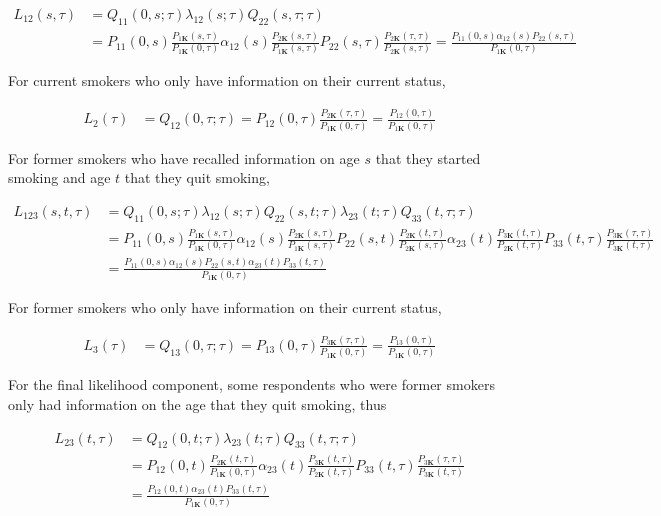 \documentclass[11pt,a4paper]{article}
\newcommand{\K}{\ensuremath{\bm{K}}}
\begin{document}
\begin{align*}
L_{12}(s,\tau) & = Q_{11}(0,s;\tau)\lambda_{12}(s;\tau)Q_{22}(s,\tau;\tau) \\
& = P_{11}(0,s)\frac{P_{1\K}(s,\tau)}{P_{1\K}(0,\tau)} 
\alpha_{12}(s) \frac{P_{2\K}(s,\tau)}{P_{1\K}(s,\tau)}
P_{22}(s,\tau)\frac{P_{2\K}(\tau,\tau)}{P_{2\K}(s,\tau)}
 = \frac{P_{11}(0,s)\alpha_{12}(s)P_{22}(s,\tau)}{P_{1\K}(0,\tau)}
\end{align*}

For current smokers who only have information on their current status, 

\begin{align*}
L_2(\tau) & = Q_{12}(0,\tau;\tau)  = P_{12}(0,\tau)\frac{P_{2\K}(\tau,\tau)}{P_{1\K}(0,\tau)} 
= \frac{P_{12}(0,\tau)}{P_{1\K}(0,\tau)}  
\end{align*}

For former smokers who have recalled information on age $s$ that they started smoking and age $t$ that they quit smoking,

\begin{align*}
L_{123}(s,t,\tau) & = Q_{11}(0,s;\tau) \lambda_{12}(s;\tau) Q_{22}(s,t;\tau) \lambda_{23}(t;\tau) Q_{33}(t,\tau;\tau) \\
& = P_{11}(0,s)\frac{P_{1\K}(s,\tau)}{P_{1\K}(0,\tau)} 
\alpha_{12}(s) \frac{P_{2\K}(s,\tau)}{P_{1\K}(s,\tau)}
P_{22}(s,t)\frac{P_{2\K}(t,\tau)}{P_{2\K}(s,\tau)}
\alpha_{23}(t) \frac{P_{3\K}(t,\tau)}{P_{2\K}(t,\tau)}
P_{33}(t,\tau)\frac{P_{3\K}(\tau,\tau)}{P_{3\K}(t,\tau)} \\
& = \frac{P_{11}(0,s) \alpha_{12}(s) P_{22}(s,t) \alpha_{23}(t) P_{33}(t,\tau)}{P_{1\K}(0,\tau)}
\end{align*}

For former smokers who only have information on their current status, 

\begin{align*}
L_3(\tau) & = Q_{13}(0,\tau;\tau)  = P_{13}(0,\tau)\frac{P_{3\K}(\tau,\tau)}{P_{1\K}(0,\tau)} 
= \frac{P_{13}(0,\tau)}{P_{1\K}(0,\tau)}  
\end{align*}

For the final likelihood component, some respondents who were former smokers only had information on the age that they quit smoking, thus
 
\begin{align*}
L_{23}(t,\tau) & = Q_{12}(0,t;\tau) \lambda_{23}(t;\tau) Q_{33}(t,\tau;\tau) \\
& = P_{12}(0,t)\frac{P_{2\K}(t,\tau)}{P_{1\K}(0,\tau)} 
\alpha_{23}(t) \frac{P_{3\K}(t,\tau)}{P_{2\K}(t,\tau)}
P_{33}(t,\tau)\frac{P_{3\K}(\tau,\tau)}{P_{3\K}(t,\tau)} \\
& = \frac{P_{12}(0,t) \alpha_{23}(t) P_{33}(t,\tau)}{P_{1\K}(0,\tau)}
\end{align*}
\end{document}
